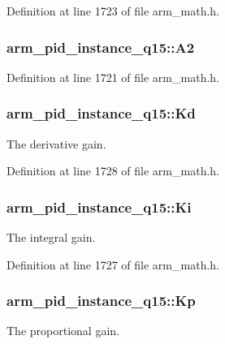Definition at line 1723 of file arm\-\_\-math.\-h.

\hypertarget{structarm__pid__instance__q15_a33e8b4c2d3e24b8b494f6edca6a89c1b}{
\subsubsection[{A2}]{ arm\-\_\-pid\-\_\-instance\-\_\-q15\-::\-A2}}\label{structarm__pid__instance__q15_a33e8b4c2d3e24b8b494f6edca6a89c1b}


Definition at line 1721 of file arm\-\_\-math.\-h.

\hypertarget{structarm__pid__instance__q15_af5d4b53091f19eff7536636b7cc43111}{
\subsubsection[{Kd}]{ arm\-\_\-pid\-\_\-instance\-\_\-q15\-::\-Kd}}\label{structarm__pid__instance__q15_af5d4b53091f19eff7536636b7cc43111}
The derivative gain. 

Definition at line 1728 of file arm\-\_\-math.\-h.

\hypertarget{structarm__pid__instance__q15_a0dcc19d5c8f7bc401acea9e8318cd777}{
\subsubsection[{Ki}]{ arm\-\_\-pid\-\_\-instance\-\_\-q15\-::\-Ki}}\label{structarm__pid__instance__q15_a0dcc19d5c8f7bc401acea9e8318cd777}
The integral gain. 

Definition at line 1727 of file arm\-\_\-math.\-h.

\hypertarget{structarm__pid__instance__q15_ad228aae24a1b6d855c93a8b9bbc1c4f1}{
\subsubsection[{Kp}]{ arm\-\_\-pid\-\_\-instance\-\_\-q15\-::\-Kp}}\label{structarm__pid__instance__q15_ad228aae24a1b6d855c93a8b9bbc1c4f1}
The proportional gain. 

